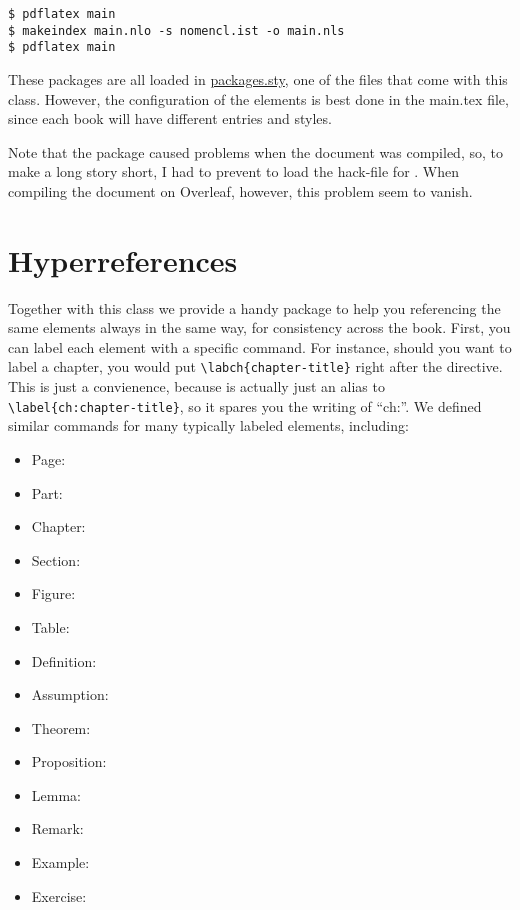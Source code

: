 \begin{lstlisting}[style=kaolstplain]
$ pdflatex main
$ makeindex main.nlo -s nomencl.ist -o main.nls
$ pdflatex main
\end{lstlisting}

These packages are all loaded in 
\href{style/packages.sty}{packages.sty}, one of the files that come with 
this class. However, the configuration of the elements is best done in 
the main.tex file, since each book will have different entries and 
styles.

Note that the  package caused problems when the 
document was compiled, so, to make a long story short, I had to prevent 
 to load the hack-file for . When 
compiling the document on Overleaf, however, this problem seem to 
vanish.


\section{Hyperreferences}

Together with this class we provide a handy package to help you 
referencing the same elements always in the same way, for consistency 
across the book. First, you can label each element with a specific 
command. For instance, should you want to label a chapter, you would put 
\lstinline|\labch{chapter-title}| right after the  
directive. This is just a convienence, because  is 
actually just an alias to \lstinline|\label{ch:chapter-title}|, so it 
spares you the writing of \enquote{ch:}. We defined similar commands for 
many typically labeled elements, including:

\begin{multicols}{2}
\setlength{\columnseprule}{0pt}
\begin{itemize}
	\item Page: 
	\item Part: 
	\item Chapter: 
	\item Section: 
	\item Figure: 
	\item Table: 
	\item Definition: 
	\item Assumption: 
	\item Theorem: 
	\item Proposition: 
	\item Lemma: 
	\item Remark: 
	\item Example: 
	\item Exercise: 
\end{itemize}
\end{multicols}

